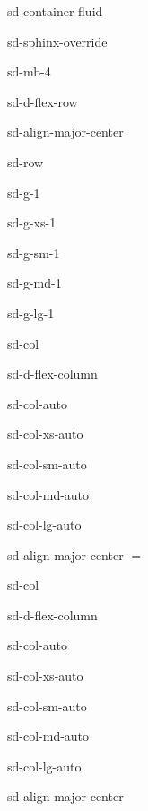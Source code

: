 \documentclass[letterpaper,10pt,english]{jupyterBook}
\begin{document}
\begin{sphinxuseclass}{sd-container-fluid}
\begin{sphinxuseclass}{sd-sphinx-override}
\begin{sphinxuseclass}{sd-mb-4}
\begin{sphinxuseclass}{sd-d-flex-row}
\begin{sphinxuseclass}{sd-align-major-center}
\begin{sphinxuseclass}{sd-row}
\begin{sphinxuseclass}{sd-g-1}
\begin{sphinxuseclass}{sd-g-xs-1}
\begin{sphinxuseclass}{sd-g-sm-1}
\begin{sphinxuseclass}{sd-g-md-1}
\begin{sphinxuseclass}{sd-g-lg-1}
\begin{sphinxuseclass}{sd-col}
\begin{sphinxuseclass}{sd-d-flex-column}
\begin{sphinxuseclass}{sd-col-auto}
\begin{sphinxuseclass}{sd-col-xs-auto}
\begin{sphinxuseclass}{sd-col-sm-auto}
\begin{sphinxuseclass}{sd-col-md-auto}
\begin{sphinxuseclass}{sd-col-lg-auto}
\begin{sphinxuseclass}{sd-align-major-center}
\sphinxAtStartPar
\(=\)

\end{sphinxuseclass}
\end{sphinxuseclass}
\end{sphinxuseclass}
\end{sphinxuseclass}
\end{sphinxuseclass}
\end{sphinxuseclass}
\end{sphinxuseclass}
\end{sphinxuseclass}
\begin{sphinxuseclass}{sd-col}
\begin{sphinxuseclass}{sd-d-flex-column}
\begin{sphinxuseclass}{sd-col-auto}
\begin{sphinxuseclass}{sd-col-xs-auto}
\begin{sphinxuseclass}{sd-col-sm-auto}
\begin{sphinxuseclass}{sd-col-md-auto}
\begin{sphinxuseclass}{sd-col-lg-auto}
\begin{sphinxuseclass}{sd-align-major-center}\begin{center}
\end{center}
\end{sphinxuseclass}
\end{sphinxuseclass}
\end{sphinxuseclass}
\end{sphinxuseclass}
\end{sphinxuseclass}
\end{sphinxuseclass}
\end{sphinxuseclass}
\end{sphinxuseclass}
\end{sphinxuseclass}
\end{sphinxuseclass}
\end{sphinxuseclass}
\end{sphinxuseclass}
\end{sphinxuseclass}
\end{sphinxuseclass}
\end{sphinxuseclass}
\end{sphinxuseclass}
\end{sphinxuseclass}
\end{sphinxuseclass}
\end{sphinxuseclass}
\end{document}
